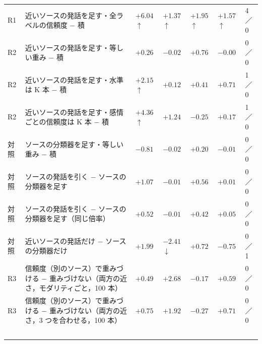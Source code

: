 \begin{longtable}{>{\raggedright}p{0.75cm}>{\raggedright}p{5.6cm}>{\raggedright}p{2.05cm}>{\raggedright}p{2.05cm}>{\raggedright}p{2.05cm}>{\raggedright}p{2.05cm}p{0.75cm}}
R1 & 近いソースの発話を足す・全ラベルの信頼度 $-$ 積 & $+6.04$$\uparrow$\newline{\tiny [$+$3.9, $+$8.2]} & $+1.37$$\uparrow$\newline{\tiny [$+$0.4, $+$2.3]} & $+1.95$$\uparrow$\newline{\tiny [$+$1.3, $+$2.6]} & $+1.57$$\uparrow$\newline{\tiny [$+$0.3, $+$2.9]} & 4／0 \\
R2 & 近いソースの発話を足す・等しい重み $-$ 積 & $+0.26$\newline{\tiny [$-$0.5, $+$1.1]} & $-0.02$\newline{\tiny [$-$0.4, $+$0.4]} & $+0.76$\newline{\tiny [$+$0.3, $+$1.2]} & $-0.00$\newline{\tiny [$-$1.4, $+$1.3]} & 0／0 \\
R2 & 近いソースの発話を足す・水準は K 本 $-$ 積 & $+2.15$$\uparrow$\newline{\tiny [$+$0.9, $+$3.4]} & $+0.12$\newline{\tiny [$-$0.7, $+$0.9]} & $+0.41$\newline{\tiny [$+$0.1, $+$0.7]} & $+0.71$\newline{\tiny [$-$0.5, $+$2.0]} & 1／0 \\
R2 & 近いソースの発話を足す・感情ごとの信頼度は K 本 $-$ 積 & $+4.36$$\uparrow$\newline{\tiny [$+$2.2, $+$6.5]} & $+1.24$\newline{\tiny [$-$0.5, $+$2.9]} & $-0.25$\newline{\tiny [$-$1.2, $+$0.7]} & $+0.17$\newline{\tiny [$-$1.7, $+$2.0]} & 1／0 \\
対照 & ソースの分類器を足す・等しい重み $-$ 積 & $-0.81$ & $-0.02$ & $+0.20$ & $-0.01$ & 0／0 \\
対照 & ソースの発話を引く $-$ ソースの分類器を足す & $+1.07$ & $-0.01$ & $+0.56$ & $+0.01$ & 0／0 \\
対照 & ソースの発話を引く $-$ ソースの分類器を足す（同じ倍率） & $+0.52$ & $-0.01$ & $+0.42$ & $+0.05$ & 0／0 \\
対照 & 近いソースの発話だけ $-$ ソースの分類器だけ & $+1.99$ & $-2.41$$\downarrow$ & $+0.72$ & $-0.75$ & 0／1 \\
R3 & 信頼度（別のソース）で重みづける $-$ 重みづけない（両方の近さ，モダリティごと，100 本） & $+0.49$ & $+2.68$ & $-0.17$ & $+0.59$ & 0／0 \\
R3 & 信頼度（別のソース）で重みづける $-$ 重みづけない（両方の近さ，3 つを合わせる，100 本） & $+0.75$ & $+1.92$ & $-0.27$ & $+0.71$ & 0／0 \\
$$
\end{longtable}
